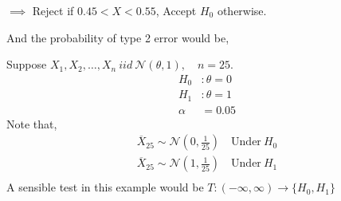 \documentclass[12pt,a4paper]{article}
\begin{document}
\( \implies \) Reject if \(0.45<X<0.55\), Accept \(H_{0}\) otherwise.  

And the probability of type 2 error would be,

\pagebreak

Suppose \(X_{1},X_{2},\ldots,X_{n} \ iid \ \mathcal{N}(\theta,1), \quad n = 25 \).  
\begin{align*}
    H_{0} &: \theta =0\\
    H_{1} &: \theta =1\\
    \alpha &= 0.05 
\end{align*}
Note that, 
\begin{align*}
    \overline{X}_{25} \sim \mathcal{N}\left( 0,\frac{1}{25} \right) \quad \text{Under} \ H_{0}\\
    \overline{X}_{25} \sim \mathcal{N}\left( 1,\frac{1}{25} \right)
    \quad \text{Under} \ H_{1}\\ 
\end{align*}
A sensible test in this example would be \(T : (-\infty, \infty) \to \{H_{0},H_{1}\} \)  
\end{document}
